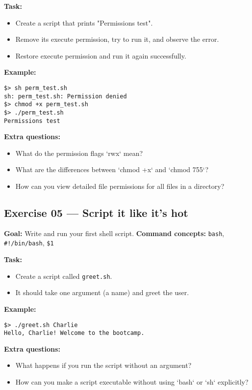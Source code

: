 \documentclass[12pt,a4paper]{article}
\begin{document}
\textbf{Task:}
\begin{itemize}
  \item Create a script that prints "Permissions test".
  \item Remove its execute permission, try to run it, and observe the error.
  \item Restore execute permission and run it again successfully.
\end{itemize}

\textbf{Example:}
\begin{lstlisting}
$> sh perm_test.sh
sh: perm_test.sh: Permission denied
$> chmod +x perm_test.sh
$> ./perm_test.sh
Permissions test
\end{lstlisting}

\textbf{Extra questions:}
\begin{itemize}
  \item What do the permission flags `rwx` mean?
  \item What are the differences between `chmod +x` and `chmod 755`?
  \item How can you view detailed file permissions for all files in a directory?
\end{itemize}

\newpage
\subsection*{Exercise 05 — Script it like it's hot}
\textbf{Goal:} Write and run your first shell script.
\textbf{Command concepts:} \texttt{bash}, \texttt{\#!/bin/bash}, \texttt{\$1}

\textbf{Task:}
\begin{itemize}
  \item Create a script called \texttt{greet.sh}.
  \item It should take one argument (a name) and greet the user.
\end{itemize}

\textbf{Example:}
\begin{lstlisting}
$> ./greet.sh Charlie
Hello, Charlie! Welcome to the bootcamp.
\end{lstlisting}

\textbf{Extra questions:}
\begin{itemize}
  \item What happens if you run the script without an argument?
  \item How can you make a script executable without using `bash` or `sh` explicitly?
\end{itemize}
\end{document}
